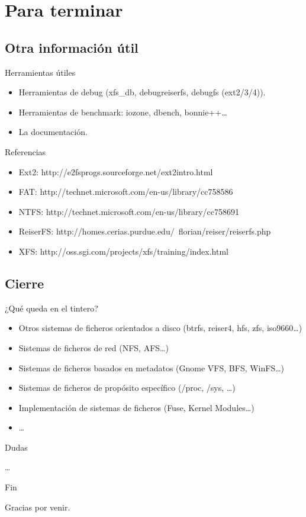 \section*{Para terminar}
\subsection*{Otra información útil}
\begin{frame}{Herramientas útiles}
  \begin{itemize}
    \item Herramientas de debug (xfs\_db, debugreiserfs, debugfs (ext2/3/4)).
    \item Herramientas de benchmark: iozone, dbench, bonnie++\dots
    \item La documentación.
  \end{itemize}
\end{frame}

\begin{frame}{Referencias}
  \begin{itemize}
    \item Ext2: http://e2fsprogs.sourceforge.net/ext2intro.html
    \item FAT: http://technet.microsoft.com/en-us/library/cc758586%
    \item NTFS: http://technet.microsoft.com/en-us/library/cc758691%
    \item ReiserFS: http://homes.cerias.purdue.edu/~florian/reiser/reiserfs.php
    \item XFS: http://oss.sgi.com/projects/xfs/training/index.html
  \end{itemize}
\end{frame}

\subsection*{Cierre}

\begin{frame}{¿Qué queda en el tintero?}
  \begin{itemize}
    \item Otros sistemas de ficheros orientados a disco (btrfs, reiser4, hfs, zfs, iso9660\dots)
    \item Sistemas de ficheros de red (NFS, AFS\dots)
    \item Sistemas de ficheros basados en metadatos (Gnome VFS, BFS, WinFS\dots)
    \item Sistemas de ficheros de propósito específico (/proc, /sys, \dots)
    \item Implementación de sistemas de ficheros (Fuse, Kernel Modules\dots)
    \item \dots
  \end{itemize}
\end{frame}

\begin{frame}{Dudas}
  \begin{center}
    \dots
  \end{center}
\end{frame}

\begin{frame}{Fin}
  \begin{center}
    Gracias por venir.
  \end{center}
\end{frame}
